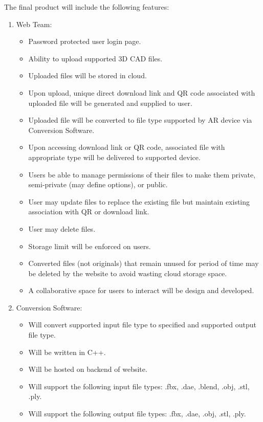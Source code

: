 % 




The final product will include the following features:

\begin{enumerate}
	\item Web Team:
	\begin{itemize}
		\item Password protected user login page. 
		\item Ability to upload supported 3D CAD files. 
		\item Uploaded files will be stored in cloud.
		\item Upon upload, unique direct download link and QR code associated with uploaded file will be generated and supplied to user. 
		\item Uploaded file will be converted to file type supported by AR device via Conversion Software. 
		\item Upon accessing download link or QR code, associated file with appropriate type will be delivered to supported device. 
		\item Users be able to manage permissions of their files to make them private, semi-private (may define options), or public.
		\item User may update files to replace the existing file but maintain existing association with QR or download link.
		\item User may delete files. 
		\item Storage limit will be enforced on users. 
		\item Converted files (not originals) that remain unused for period of time may be deleted by the website to avoid wasting cloud storage space.  
		\item A collaborative space for users to interact will be design and developed. 
	\end{itemize}
	\item Conversion Software:
	\begin{itemize}
		\item Will convert supported input file type to specified and supported output file type. 
		\item Will be written in C++. 
		\item Will be hosted on backend of website. 
		\item Will support the following input file types: .fbx, .dae, .blend, .obj, .stl, .ply.
		\item Will support the following output file types: .fbx, .dae, .obj, .stl, .ply.
	\end{itemize} 
\end{enumerate}

